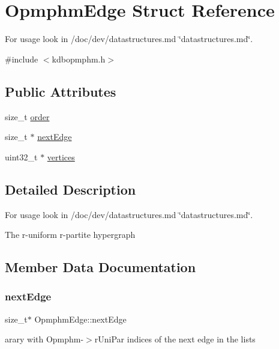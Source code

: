 \hypertarget{structOpmphmEdge}{}\section{Opmphm\+Edge Struct Reference}
\label{structOpmphmEdge}


For usage look in /doc/dev/datastructures.md \char`\"{}datastructures.\+md\char`\"{}.  




{\ttfamily \#include $<$kdbopmphm.\+h$>$}

\subsection*{Public Attributes}
\begin{DoxyCompactItemize}
\item 
size\+\_\+t \hyperlink{structOpmphmEdge_a6e4538c7c7f5d72f8ecab6aca834e8c8}{order}
\item 
size\+\_\+t $\ast$ \hyperlink{structOpmphmEdge_a1689e74757cbfcd2ee3e51eb9180c8a7}{next\+Edge}
\item 
uint32\+\_\+t $\ast$ \hyperlink{structOpmphmEdge_ae8d5721fe78750b17b5d4a9b8e3fc2b2}{vertices}
\end{DoxyCompactItemize}


\subsection{Detailed Description}
For usage look in /doc/dev/datastructures.md \char`\"{}datastructures.\+md\char`\"{}. 

The r-\/uniform r-\/partite hypergraph 

\subsection{Member Data Documentation}
\mbox{\label{structOpmphmEdge_a1689e74757cbfcd2ee3e51eb9180c8a7}} 
\subsubsection{\texorpdfstring{next\+Edge}{nextEdge}}
{\footnotesize\ttfamily size\+\_\+t$\ast$ Opmphm\+Edge\+::next\+Edge}

arary with Opmphm-\/$>$r\+Uni\+Par indices of the next edge in the lists \mbox{\label{structOpmphmEdge_a6e4538c7c7f5d72f8ecab6aca834e8c8}} 
